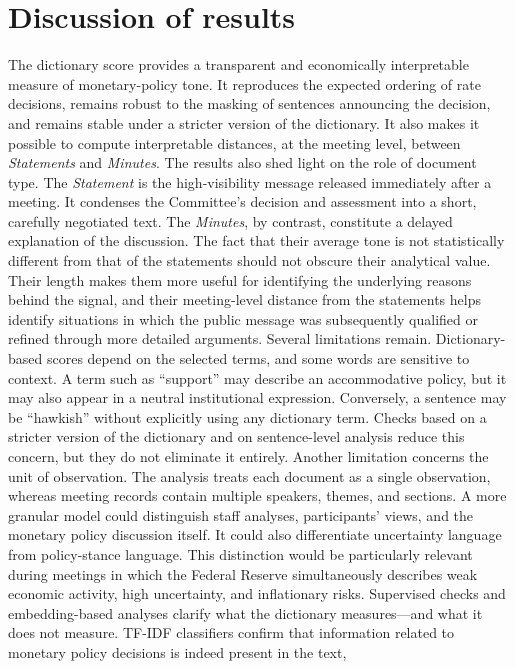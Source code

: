\documentclass{article}
\begin{document}
\section{Discussion of results}

The dictionary score provides a transparent and economically interpretable measure of monetary-policy tone. It reproduces the expected ordering of rate decisions, remains robust to the masking 
of sentences announcing the decision, and remains stable under a stricter version of the dictionary. It also makes it possible to compute interpretable distances, at the meeting level, between \textit{Statements} and \textit{Minutes}.
The results also shed light on the role of document type. The \textit{Statement} is the high-visibility message released immediately after a meeting. It condenses the Committee’s decision and assessment into a short, carefully 
negotiated text. The \textit{Minutes}, by contrast, constitute a delayed explanation of the discussion. The fact that their average tone is not statistically different from that of the statements should not obscure their analytical 
value. Their length makes them more useful for identifying the underlying reasons behind the signal, and their meeting-level distance from the statements helps identify situations in which the public message was subsequently 
qualified or refined through more detailed arguments.
Several limitations remain. Dictionary-based scores depend on the selected terms, and some words are sensitive to context. A term such as ``support'' may describe an accommodative policy, but it may also appear 
in a neutral institutional expression. Conversely, a sentence may be ``hawkish'' without explicitly using any dictionary term. Checks based on a stricter version of the dictionary and on sentence-level analysis reduce this concern, 
but they do not eliminate it entirely.
Another limitation concerns the unit of observation. The analysis treats each document as a single observation, whereas meeting records contain multiple speakers, themes, and sections. A more granular model could distinguish staff 
analyses, participants’ views, and the monetary policy discussion itself. It could also differentiate uncertainty language from policy-stance language. This distinction would be particularly relevant during 
meetings in which the Federal Reserve simultaneously describes weak economic activity, high uncertainty, and inflationary risks.
Supervised checks and embedding-based analyses clarify what the dictionary measures—and what it does not measure. TF-IDF classifiers confirm that information related to monetary policy decisions is indeed present in the text, 
\end{document}
